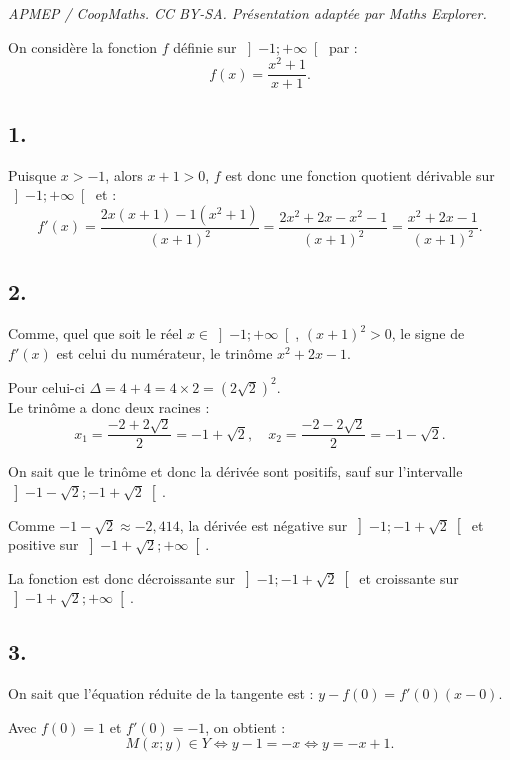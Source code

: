 \documentclass[10pt]{article}
\begin{document}
\noindent\textit{APMEP / CoopMaths. CC BY-SA. Présentation adaptée par Maths Explorer.}\par\medskip
On considère la fonction \(f\) définie sur \(\left] -1 ; +\infty \right[\) par :
	\[
	f(x) = \dfrac{x^2 + 1}{x + 1}.
	\]
	
	\subsection*{1.}
	
	Puisque \(x > -1\), alors \(x + 1 > 0\), \(f\) est donc une fonction quotient dérivable sur \(\left] -1 ; +\infty \right[\) et :
	\[
	f'(x) = \dfrac{2x(x + 1) - 1(x^2 + 1)}{(x + 1)^2} = \dfrac{2x^2 + 2x - x^2 - 1}{(x + 1)^2} = \dfrac{x^2 + 2x - 1}{(x + 1)^2}.
	\]
	
	\subsection*{2.}
	
	Comme, quel que soit le réel \(x \in \left] -1 ; +\infty \right[\), \((x + 1)^2 > 0\), le signe de \(f'(x)\) est celui du numérateur, le trinôme \(x^2 + 2x - 1\).
	
	Pour celui-ci \(\Delta = 4 + 4 = 4 \times 2 = (2\sqrt{2})^2\).\\ Le trinôme a donc deux racines :
	\[
	x_1 = \dfrac{-2 + 2\sqrt{2}}{2} = -1 + \sqrt{2}, \quad x_2 = \dfrac{-2 - 2\sqrt{2}}{2} = -1 - \sqrt{2}.
	\]
	
	On sait que le trinôme et donc la dérivée sont positifs, sauf sur l'intervalle \(\left] -1 - \sqrt{2} ; -1 + \sqrt{2} \right[\).
	
	Comme \(-1 - \sqrt{2} \approx -2,414\), la dérivée est négative sur \(\left] -1 ; -1 + \sqrt{2} \right[\) et positive sur \(\left] -1 + \sqrt{2} ; +\infty \right[\).
	
	La fonction est donc décroissante sur \(\left] -1 ; -1 + \sqrt{2} \right[\) et croissante sur \(\left] -1 + \sqrt{2} ; +\infty \right[\).
	
	\subsection*{3.}
	
	On sait que l'équation réduite de la tangente est : \(y - f(0) = f'(0)(x - 0)\).
	
	Avec \(f(0) = 1\) et \(f'(0) = -1\), on obtient :
	\[
	M(x ; y) \in Y \Leftrightarrow y - 1 = -x \Leftrightarrow y = -x + 1.
	\]
	
\end{document}
